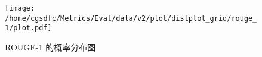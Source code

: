 \begin{figure}[H]%
\centering%
\texttt{[image: /home/cgsdfc/Metrics/Eval/data/v2/plot/distplot\_grid/rouge\_1/plot.pdf]}%
\caption{ROUGE{-}1 的概率分布图}%
\label{fig:ROUGE{-}1dist}%
\end{figure}
